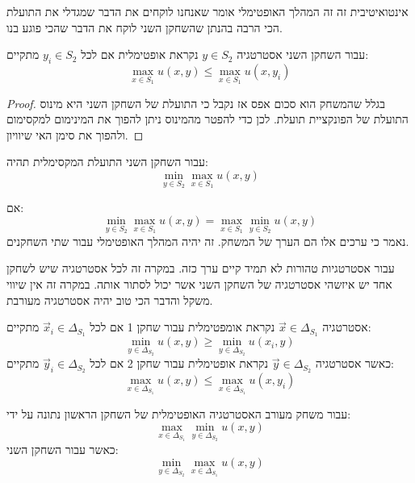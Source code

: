 \documentclass{tstextbook}
\begin{document}
\begin{remark}
אינטואיטיבית זה זה המהלך האופטימלי אומר שאנחנו לוקחים את הדבר שמגדלי את התועלת הכי הרבה בהנתן שהשחקן השני לוקח את הדבר שהכי פוגע בנו.

\end{remark}
\begin{proposition}
עבור השחקן השני אסטרטגיה \(y \in S_{2}\) נקראת אופטימלית אם לכל \(y_{i}\in S_{2}\) מתקיים:
$$\max _{x \in S_{1}} u(x,y)\leq \max_{x \in S_{1}}  u(x, y_{i})$$

\end{proposition}
\begin{proof}
בגלל שהמשחק הוא סכום אפס אז נקבל כי התועלת של השחקן השני היא מינוס התועלת של הפונקציית תועלת. לכן כדי להפטר מהמינוס ניתן להפוך את המינימום למקסימום ולהפוך את סימן האי שיוויון.

\end{proof}
\begin{corollary}
עבור השחקן השני התועלת המקסימלית תהיה:
$$\min _{y \in S_{2}}\max _{x \in S_{1}}u(x,y)$$

\end{corollary}
\begin{definition}
אם:
$$\min_{y \in S_{2}} \max _{x \in S_{1}}u(x,y)=\max_{x \in S_{1}}\min _{y \in S_{2}} u(x,y)$$
נאמר כי ערכים אלו הם הערך של המשחק. זה יהיה המהלך האופטימלי עבור שתי השחקנים.

\end{definition}
\begin{remark}
עבור אסטרטגיות טהורות לא תמיד קיים ערך כזה. במקרה זה לכל אסטרטגיה שיש לשחקן אחד יש איזשהי אסטרטגיה של השחקן השני אשר יכול לסתור אותה. במקרה זה אין שיווי משקל והדבר הכי טוב יהיה אסטרטגיה מעורבת.

\end{remark}
\begin{definition}
אסטרטגיה \(\vec{x} \in \Delta _{S_{1}}\) נקראת אומפטימלית עבור שחקן 1 אם לכל \(\vec{x}_{i}\in \Delta _{S_{1}}\) מתקיים:
$$\min _{y \in \Delta_{S_{2}}}u(x,y)\geq \min _{y \in \Delta_{S_{2}}}u(x_{i},y)$$
כאשר אסטרטגיה \(\vec{y} \in \Delta_{S_{2}}\) נקראת אופטימלית עבור שחקן 2 אם לכל \(\vec{y}_{i}\in \Delta_{S_{2}}\) מתקיים:
$$\max _{x \in \Delta_{S_{1}}}u(x,y)\leq \max _{x \in \Delta_{S_{1}}}u(x,y_{i})$$

\end{definition}
\begin{corollary}
עבור משחק מעורב האסטרטגיה האופטימלית של השחקן הראשון נתונה על ידי:
$$\max_{x \in \Delta_{S_{1}}}\min _{y \in \Delta_{S_{2}}} u(x,y)$$
כאשר עבור השחקן השני:
$$\min_{y \in \Delta_{S_{2}}} \max _{x \in \Delta_{S_{1}}}u(x,y)$$

\end{corollary}
\end{document}
